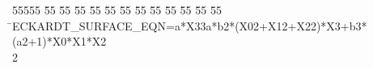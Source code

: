%
%
\begin{tabbing}
55555 \= 55 \= 55 \= 55 \= 55 \= 55 \= 55 \= 55 \= 55 \= 55 \= 55 \= 55 \= 55 \= \>ECKARDT\_SURFACE\_EQN=a*X33a*b2*(X02+X12+X22)*X3+b3*(a2+1)*X0*X1*X2\\[0pt]
2\>\end{tabbing}
